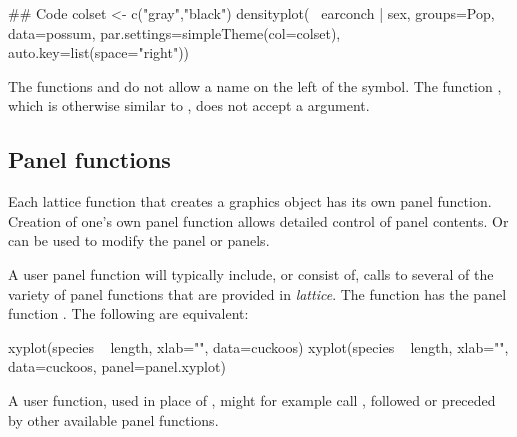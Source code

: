 \begin{Schunk}
\begin{Sinput}
## Code
colset <- c("gray","black")
densityplot(~ earconch | sex, groups=Pop,
            data=possum,
            par.settings=simpleTheme(col=colset),
            auto.key=list(space="right"))
\end{Sinput}
\end{Schunk}
The functions  and  do not
allow a name on the left of the \txtt{$\sim$} symbol. The function
, which is otherwise similar to ,
does not accept a  argument.

\subsection{Panel functions}\label{ss:panel}

  Each lattice function that creates a graphics
object has its own panel function.  Creation of one's own panel
function allows detailed control of panel contents. Or 
can be used to modify the panel or panels.

A user panel function will typically include, or consist of, calls to
several of the variety of panel functions that are provided in
\textit{lattice}.  The function  has the panel function
.  The following are equivalent:
\begin{Schunk}
\begin{Sinput}
xyplot(species ~ length, xlab="", data=cuckoos)
xyplot(species ~ length, xlab="", data=cuckoos,
       panel=panel.xyplot)
\end{Sinput}
\end{Schunk}
\noindent
A user function, used in place of ,
might for example call ,
followed or preceded by other available panel functions.

